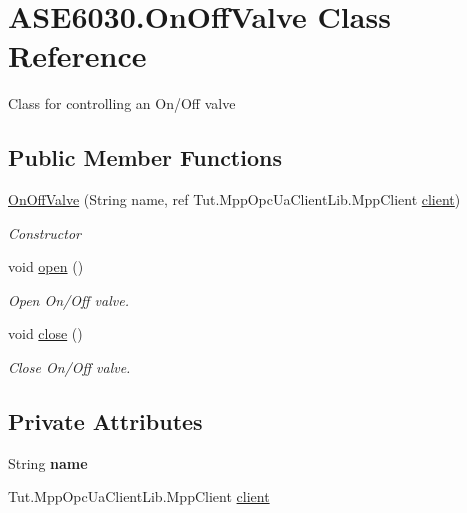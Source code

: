 \hypertarget{class_a_s_e6030_1_1_on_off_valve}{}\section{A\+S\+E6030.\+On\+Off\+Valve Class Reference}
\label{class_a_s_e6030_1_1_on_off_valve}


Class for controlling an On/\+Off valve  


\subsection*{Public Member Functions}
\begin{DoxyCompactItemize}
\item 
\hyperlink{class_a_s_e6030_1_1_on_off_valve_a210880c9d65d53684d468e0290b84772}{On\+Off\+Valve} (String name, ref Tut.\+Mpp\+Opc\+Ua\+Client\+Lib.\+Mpp\+Client \hyperlink{class_a_s_e6030_1_1_on_off_valve_a0e67c47fbb52742581ce500f22fbb288}{client})
\begin{DoxyCompactList}\small\item\em Constructor \end{DoxyCompactList}\item 
\mbox{\label{class_a_s_e6030_1_1_on_off_valve_a682309032082c36a32daa1f7672e4101}} 
void \hyperlink{class_a_s_e6030_1_1_on_off_valve_a682309032082c36a32daa1f7672e4101}{open} ()
\begin{DoxyCompactList}\small\item\em Open On/\+Off valve. \end{DoxyCompactList}\item 
\mbox{\label{class_a_s_e6030_1_1_on_off_valve_a4c878ae2b5970dff941dceb37f0aa863}} 
void \hyperlink{class_a_s_e6030_1_1_on_off_valve_a4c878ae2b5970dff941dceb37f0aa863}{close} ()
\begin{DoxyCompactList}\small\item\em Close On/\+Off valve. \end{DoxyCompactList}\end{DoxyCompactItemize}
\subsection*{Private Attributes}
\begin{DoxyCompactItemize}
\item 
\mbox{\label{class_a_s_e6030_1_1_on_off_valve_a78843de2753da53be960ab1aa440ac14}} 
String {\bfseries name}
\item 
Tut.\+Mpp\+Opc\+Ua\+Client\+Lib.\+Mpp\+Client \hyperlink{class_a_s_e6030_1_1_on_off_valve_a0e67c47fbb52742581ce500f22fbb288}{client}
\end{DoxyCompactItemize}


